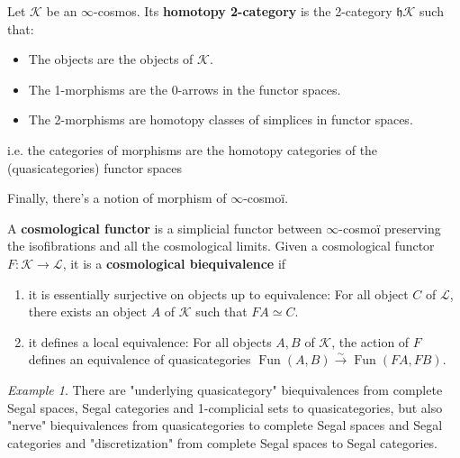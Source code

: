 \documentclass[10pt,a4paper]{article}
\newcommand{\ca}[1]{\mathcal{#1}}
\newcommand{\fk}[1]{\mathfrak{#1}}
\DeclareMathOperator{\Fun}{Fun}
\theoremstyle{plain}
\theoremstyle{definition}
\theoremstyle{remark}
\newtheorem{example}[theorem]{Example}
\begin{document}
\begin{definition}
    Let $\ca K$ be an $\infty$-cosmos. Its \textbf{homotopy 2-category} is the 2-category $\fk h \ca K$ such that:
    \begin{itemize}
        \item The objects are the objects of $\ca K$.
        \item The 1-morphisms are the 0-arrows in the functor spaces.
        \item The 2-morphisms are homotopy classes of simplices in functor spaces.
    \end{itemize}
    i.e. the categories of morphisms are the homotopy categories of the (quasicategories) functor spaces
\end{definition}

Finally, there's a notion of morphism of $\infty$-cosmoï.

\begin{definition}
    \label{def:cosmological_functor}
     
    A \textbf{cosmological functor} is a simplicial functor between $\infty$-cosmoï preserving the isofibrations and all the cosmological limits. Given a cosmological functor $F : \ca K \to \ca L$, it is a \textbf{cosmological biequivalence} if
    \begin{enumerate}
        \item it is essentially surjective on objects up to equivalence: For all object $C$ of $\ca L$, there exists an object $A$ of $\ca K$ such that $FA \simeq C$.
        \item it defines a local equivalence: For all objects $A, B$ of $\ca K$, the action of $F$ defines an equivalence of quasicategories $\Fun(A, B) \xrightarrow{\sim} \Fun(FA, FB)$.
    \end{enumerate}
\end{definition}

\begin{example}
    \label{ex:cosmological_biequiv}
    There are "underlying quasicategory" biequivalences from complete Segal spaces, Segal categories and 1-complicial sets to quasicategories, but also "nerve" biequivalences from quasicategories to complete Segal spaces and Segal categories and "discretization" from complete Segal spaces to Segal categories.
\end{example}
\end{document}
